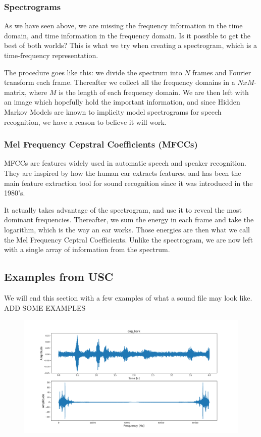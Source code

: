 \subsubsection{Spectrograms}
As we have seen above, we are missing the frequency information in the time domain, and time information in the frequency domain. Is it possible to get the best of both worlds? This is what we try when creating a spectrogram, which is a time-frequency representation. 

The procedure goes like this: we divide the spectrum into $N$ frames and Fourier transform each frame. Thereafter we collect all the frequency domains in a $NxM$-matrix, where $M$ is the length of each frequency domain. We are then left with an image which hopefully hold the important information, and since Hidden Markov Models are known to implicity model spectrograms for speech recognition, we have a reason to believe it will work. \cite{spectrograms}

\subsubsection{Mel Frequency Cepstral Coefficients (MFCCs)}
MFCCs are features widely used in automatic speech and speaker recognition. \cite{mfcc} They are inspired by how the human ear extracts features, and has been the main feature extraction tool for sound recognition since it was introduced in the 1980's. 

It actually takes advantage of the spectrogram, and use it to reveal the most dominant frequencies. Thereafter, we sum the energy in each frame and take the logarithm, which is the way an ear works. Those energies are then what we call the Mel Frequency Ceptral Coefficients. Unlike the spectrogram, we are now left with a single array of information from the spectrum. 

\subsection{Examples from USC}
We will end this section with a few examples of what a sound file may look like. 
ADD SOME EXAMPLES

\begin{figure} [H]
	\centering
	\includegraphics[scale=0.4]{../plots/dog_bark_freq.png}
	\caption{}
	\label{fig:dog}
\end{figure} 